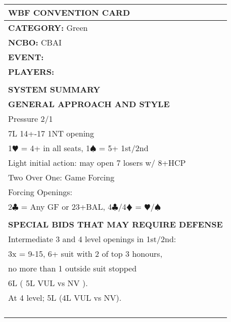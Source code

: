 \documentclass{article}
\newcommand\C{\ensuremath{\clubsuit}}
\newcommand\D{\color{red}\ensuremath{\vardiamondsuit}}
\renewcommand\H{\color{red}\ensuremath{\varheartsuit}}
\renewcommand\S{\ensuremath{\spadesuit}}
\newcommand\N{{\footnotesize NT}}
\begin{document}
\begin{minipage}{5mm}
	\begin{tabular}{| p{5mm} |}
	\end{tabular}
\end{minipage}
\begin{minipage}{90mm}
	\begin{tabular}{| p{88mm} |}
		\hline
		\cellcolor{green!25} \textbf{WBF CONVENTION CARD} \\ \hline
		\textbf{CATEGORY:} Green\\
		\textbf{NCBO:} CBAI\\
		\textbf{EVENT:} \\
		\textbf{PLAYERS:} \\
		\multirow{2}{*}{} \\
		\\
		\hline \cellcolor{green!25} \textbf{SYSTEM SUMMARY} \\ \hline
		\cellcolor{orange!25}\textbf{GENERAL APPROACH AND STYLE} \\ \hline
		Pressure 2/1\\ \hline
		7L 14+-17 1{\N} opening\\ \hline
		1{\H} = 4+ in all seats, 1{\S} = 5+ 1st/2nd\\ \hline
		Light initial action: may open 7 losers w/ 8+HCP\\ \hline
		Two Over One: Game Forcing\\ \hline
		Forcing Openings:\\ \hline
		{2\C} = Any GF or 23+BAL, 4{\C}/4{\D} = {\H}/{\S} \\ \hline
		\\ \hline
		\cellcolor{orange!25}\textbf{SPECIAL BIDS THAT MAY REQUIRE DEFENSE} \\ \hline
		Intermediate 3 and 4 level openings in 1st/2nd: \\ \hline
		3x = 9-15, 6+ suit with 2 of top 3 honours,\\ \hline
		no more than 1 outside suit stopped\\ \hline
		6L ( 5L VUL vs NV ).\\ \hline
		At 4 level; 5L (4L VUL vs NV). \\ \hline
		\\ \hline
		\\ \hline
		\\ \hline
		\\ \hline

\end{tabular}
\end{minipage}
\end{document}
